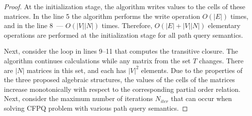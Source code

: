 \begin{proof}
At the initialization stage, the algorithm writes values to the cells of these matrices. In the line 5 the algorithm performs the write operation $O(|E|)$ times, and in the line 8~--- $O(|V||N|)$ times. Therefore, $O(|E|+|V||N|)$ elementary operations are performed at the initialization stage for all path query semantics.

Next, consider the loop in lines 9--11 that computes the transitive closure. The algorithm continues calculations while any matrix from the set $T$ changes. There are $|N|$ matrices in this set, and each has $|V|^2$ elements. Due to the properties of the three proposed algebraic structures, the values of the cells of the matrices increase monotonically with respect to the corresponding partial order relation. Next, consider the maximum number of iterations $N_{\textit{iter}}$ that can occur when solving CFPQ problem with various path query semantics.


\end{proof}
